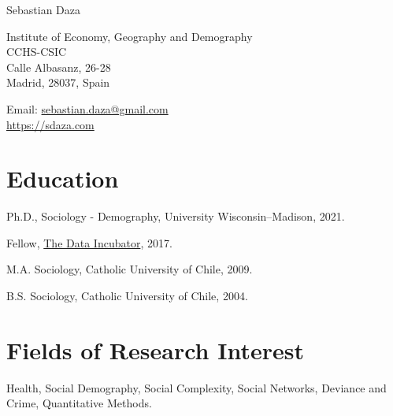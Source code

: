 \documentclass[10pt,letterpaper]{article}
\def\name{Sebastian Daza}
\renewenvironment{itemize}{
  \begin{list}{}{
    \setlength{\leftmargin}{1.5em}
    \setlength{\itemsep}{0.25em}
    \setlength{\parskip}{0pt}
    \setlength{\parsep}{0.25em}
  }
}{
  \end{list}
}
\begin{document}

\centerline{\huge \name}

\bigskip
\bigskip

\begin{minipage}[t]{.75\textwidth}
  Institute of Economy, Geography and Demography \\
  CCHS-CSIC \\
  Calle Albasanz, 26-28 \\
  Madrid, 28037, Spain \\
\end{minipage}
\begin{minipage}[t]{0.3\textwidth}
  Email: \href{mailto:sebastian.daza@gmail.com}{sebastian.daza@gmail.com} \\
  \href{https://sdaza.com/}{https://sdaza.com} \\

\end{minipage}

\bigskip
\bigskip

\section*{Education}

\begin{itemize}
  \item Ph.D., Sociology - Demography, University Wisconsin--Madison, 2021.
  \item Fellow, \href{https://www.thedataincubator.com/fellowship.html}{The Data Incubator}, 2017.
  \item M.A. Sociology, Catholic University of Chile, 2009.
  \item B.S. Sociology, Catholic University of Chile, 2004.
\end{itemize}

\section*{Fields of Research Interest}

\begin{itemize}
\item  Health, Social Demography, Social Complexity, Social Networks, Deviance and Crime, Quantitative Methods.
\end{itemize}
\end{document}
